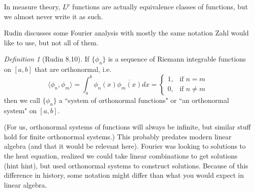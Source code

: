 \documentclass{article}
\theoremstyle{plain}
\theoremstyle{remark}
\newtheorem{definition}{Definition}
\begin{document}
In measure theory, $L^p$ functions are actually equivalence classes of functions,
but we almost never write it as such.

Rudin discusses some Fourier analysis with mostly the same notation
Zahl would like to use, but not all of them.
\begin{definition}[Rudin 8.10]
	If $\{\phi_n\}$ is a sequence of Riemann integrable functions
	on $[a,b]$ that are orthonormal, i.e.
	\[
		\langle \phi_n , \phi_m \rangle =
		\int_a^b \phi_n(x) \overline{\phi_m(x)}dx
		= \begin{cases} 1, & \text{if }n = m\\
		0, & \text{if }n \neq m \end{cases}
	\]
	then we call $\{\phi_n\}$ a
	``system of orthonormal functions" or ``an orthonormal system" on $[a,b]$.
\end{definition}
(For us, orthonormal systems of functions will always be infinite,
but similar stuff hold for finite orthonormal systems.)
This probably predates modern linear algebra (and that it would be relevant here).
Fourier was looking to solutions to the heat equation,
realized we could take linear combinations to get solutions (hint hint),
but used orthonormal systems to construct solutions.
Because of this difference in history, some notation might differ
than what you would expect in linear algebra.
\end{document}
